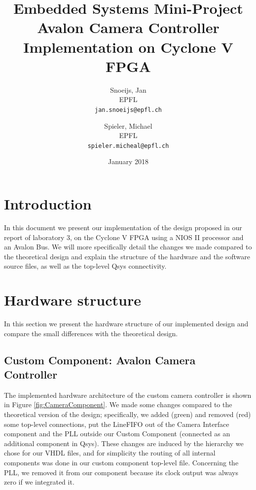 \documentclass{article}
\title{Embedded Systems Mini-Project\\
 Avalon Camera Controller Implementation on Cyclone V FPGA}
\author{
  Snoeijs, Jan\\
  EPFL\\
  \texttt{jan.snoeijs@epfl.ch}
  \and
  Spieler, Michael\\
  EPFL\\
  \texttt{spieler.micheal@epfl.ch}
  }
\date{January 2018}
\begin{document}
\maketitle

\section{Introduction}
In this document we present our implementation of the design proposed in our report of laboratory 3, on the Cyclone V FPGA using a NIOS II processor and an Avalon Bus. We will more specifically detail the changes we made compared to the theoretical design and explain the structure of the hardware and the software source files, as well as the top-level Qsys connectivity.

\section{Hardware structure}

In this section we present the hardware structure of our implemented design and compare the small differences with the theoretical design.

\subsection{Custom Component: Avalon Camera Controller}

The implemented hardware architecture of the custom camera controller is shown in Figure \ref{fig:CameraComponent}. We made some changes compared to the theoretical version of the design; specifically, we added (green) and removed (red) some top-level connections, put the LineFIFO out of the Camera Interface component and the PLL outside our Custom Component (connected as an additional component in Qsys). These changes are induced by the hierarchy we chose for our VHDL files, and for simplicity the routing of all internal components was done in our custom component top-level file. Concerning the PLL, we removed it from our component because its clock output was always zero if we integrated it.
\end{document}

